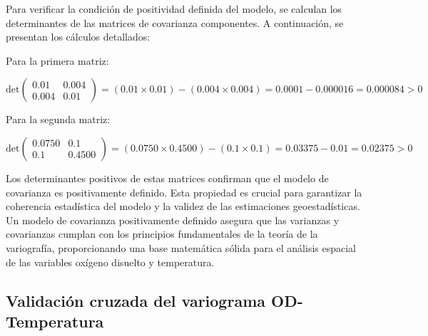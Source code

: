 Para verificar la condición de positividad definida del modelo, se calculan los determinantes de las matrices de covarianza componentes. A continuación, se presentan los cálculos detallados:

Para la primera matriz:

\[
\text{det} \begin{pmatrix}
0.01 & 0.004 \\
0.004 & 0.01
\end{pmatrix} = (0.01 \times 0.01) - (0.004 \times 0.004) = 0.0001 - 0.000016 = 0.000084 > 0
\]

Para la segunda matriz:

\[
\text{det} \begin{pmatrix}
0.0750 & 0.1 \\
0.1 & 0.4500
\end{pmatrix} = (0.0750 \times 0.4500) - (0.1 \times 0.1) = 0.03375 - 0.01 = 0.02375 > 0
\]

Los determinantes positivos de estas matrices confirman que el modelo de covarianza es positivamente definido. Esta propiedad es crucial para garantizar la coherencia estadística del modelo y la validez de las estimaciones geoestadísticas. Un modelo de covarianza positivamente definido asegura que las varianzas y covarianzas cumplan con los principios fundamentales de la teoría de la variografía, proporcionando una base matemática sólida para el análisis espacial de las variables oxígeno disuelto y temperatura.



\subsection{Validación cruzada del variograma OD-Temperatura}

